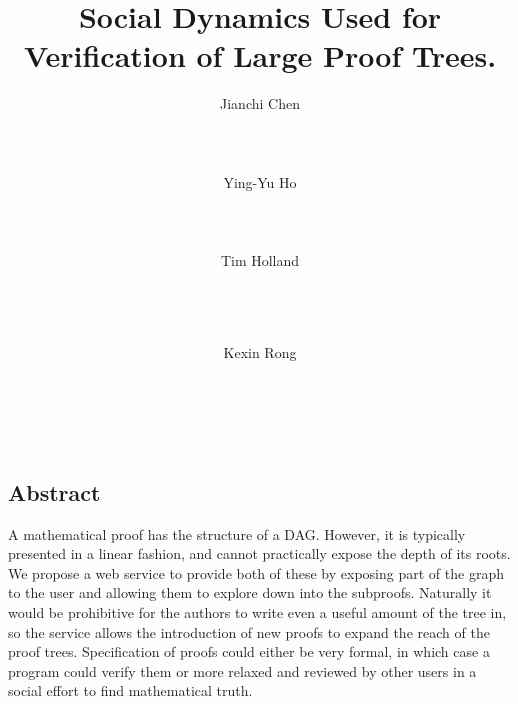 \documentclass{acm_proc_article-sp}
\begin{document}
\title{\Large \bf Social Dynamics Used for Verification of Large Proof Trees.}
%
\author{
\alignauthor
Jianchi Chen\\
       \\
       \\
       \\
\alignauthor
Ying-Yu Ho\\
       \\
       \\
       \\
\alignauthor
Tim Holland\\
       \\
       \\
       \\
\and  %
\alignauthor 
Kexin Rong\\
        \\
       \\
       \\
}

\maketitle

\thispagestyle{empty}

\subsection*{Abstract}
A mathematical proof has the structure of a DAG. However, it is typically
presented in a linear fashion, and cannot practically expose the depth of its
roots. We propose a web service to provide both of these by exposing part of
the graph to the user and allowing them to explore down into the subproofs.
Naturally it would be prohibitive for the authors to write even a useful amount
of the tree in, so the service allows the introduction of new proofs to expand
the reach of the proof trees. Specification of proofs could either be very
formal, in which case a program could verify them or more relaxed and reviewed
by other users in a social effort to find mathematical truth.
\end{document}
